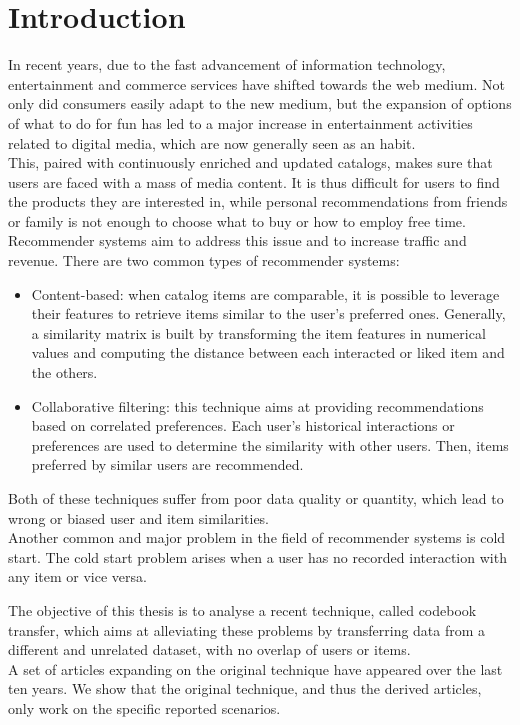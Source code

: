 \chapter{Introduction}

In recent years, due to the fast advancement of information technology, entertainment and commerce services have shifted towards the web medium.
Not only did consumers easily adapt to the new medium, but the expansion of options of what to do for fun has led to a major increase in entertainment activities related to digital media, which are now generally seen as an habit.\\
This, paired with continuously enriched and updated catalogs, makes sure that users are faced with a mass of media content. It is thus difficult for users to find the products they are interested in, while personal recommendations from friends or family is not enough to choose what to buy or how to employ free time. Recommender systems aim to address this issue and to increase traffic and revenue. There are two common types of recommender systems:
\begin{itemize}
\item Content-based: when catalog items are comparable, it is possible to leverage their features to retrieve items similar to the user's preferred ones. Generally, a similarity matrix is built by transforming the item features in numerical values and computing the distance between each interacted or liked item and the others.
\item Collaborative filtering: this technique aims at providing recommendations based on correlated preferences. Each user's historical interactions or preferences are used to determine the similarity with other users. Then, items preferred by similar users are recommended.
\end{itemize}
Both of these techniques suffer from poor data quality or quantity, which lead to wrong or biased user and item similarities.\\
Another common and major problem in the field of recommender systems is cold start.
The cold start problem arises when a user has no recorded interaction with any item or vice versa.\par
The objective of this thesis is to analyse a recent technique, called codebook transfer, which aims at alleviating these problems by transferring data from a different and unrelated dataset, with no overlap of users or items.\\
A set of articles expanding on the original technique have appeared over the last ten years.
We show that the original technique, and thus the derived articles, only work on the specific reported scenarios.



